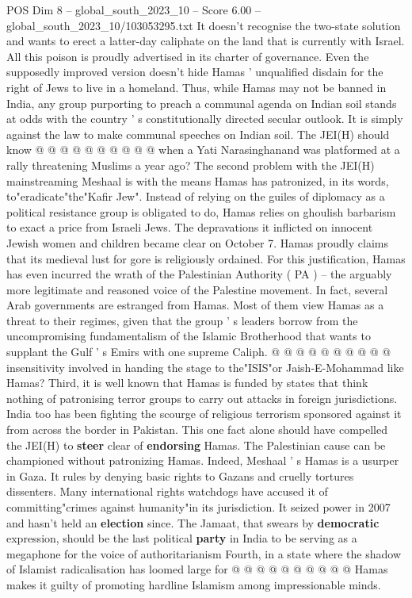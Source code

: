 \begin{textsample}{POS Dim 8 – global\_south\_2023\_10 – Score 6.00 – global\_south\_2023\_10/103053295.txt}
It doesn't recognise the two-state solution and wants to erect a latter-day caliphate on the land that is currently with Israel.
All this poison is proudly advertised in its charter of governance.
Even the supposedly improved version doesn't hide Hamas ' unqualified disdain for the right of Jews to live in a homeland.
Thus, while Hamas may not be banned in India, any group purporting to preach a communal agenda on Indian soil stands at odds with the country ' s constitutionally directed secular outlook.
It is simply against the law to make communal speeches on Indian soil.
The JEI(H) should know @ @ @ @ @ @ @ @ @ @ when a Yati Narasinghanand was platformed at a rally threatening Muslims a year ago?
The second problem with the JEI(H) mainstreaming Meshaal is with the means Hamas has patronized, in its words, to"eradicate"the"Kafir Jew".
Instead of relying on the guiles of diplomacy as a political resistance group is obligated to do, Hamas relies on ghoulish barbarism to exact a price from Israeli Jews.
The depravations it inflicted on innocent Jewish women and children became clear on October 7.
Hamas proudly claims that its medieval lust for gore is religiously ordained.
For this justification, Hamas has even incurred the wrath of the Palestinian Authority ( PA ) -- the arguably more legitimate and reasoned voice of the Palestine movement.
In fact, several Arab governments are estranged from Hamas.
Most of them view Hamas as a threat to their regimes, given that the group ' s leaders borrow from the uncompromising fundamentalism of the Islamic Brotherhood that wants to supplant the Gulf ' s Emirs with one supreme Caliph. @ @ @ @ @ @ @ @ @ @ insensitivity involved in handing the stage to the"ISIS"or Jaish-E-Mohammad like Hamas?
Third, it is well known that Hamas is funded by states that think nothing of patronising terror groups to carry out attacks in foreign jurisdictions.
India too has been fighting the scourge of religious terrorism sponsored against it from across the border in Pakistan.
This one fact alone should have compelled the JEI(H) to \textbf{steer} clear of \textbf{endorsing} Hamas.
The Palestinian cause can be championed without patronizing Hamas.
Indeed, Meshaal ' s Hamas is a usurper in Gaza.
It rules by denying basic rights to Gazans and cruelly tortures dissenters.
Many international rights watchdogs have accused it of committing"crimes against humanity"in its jurisdiction.
It seized power in 2007 and hasn't held an \textbf{election} since.
The Jamaat, that swears by \textbf{democratic} expression, should be the last political \textbf{party} in India to be serving as a megaphone for the voice of authoritarianism Fourth, in a state where the shadow of Islamist radicalisation has loomed large for @ @ @ @ @ @ @ @ @ @ Hamas makes it guilty of promoting hardline Islamism among impressionable minds.

\end{textsample}

